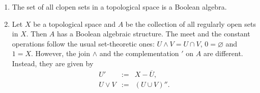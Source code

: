 \documentclass[12pt]{article}
\begin{document}
\begin{enumerate}
\item The set of all clopen sets in a topological space is a Boolean algebra.
\item Let $X$ be a topological space and $A$ be the collection of all regularly open sets in $X$.  Then $A$ has a Boolean algebraic structure.  The meet and the constant operations follow the usual set-theoretic ones: $U\wedge V=U\cap V$, $0=\varnothing$ and $1=X$.  However, the join $\wedge$ and the complementation $'$ on $A$ are different.  Instead, they are given by
\begin{eqnarray}
U'&:=&X-\overline{U},\\
U\vee V&:=& (U\cup V)''.
\end{eqnarray}
\end{enumerate}

\end{document}
